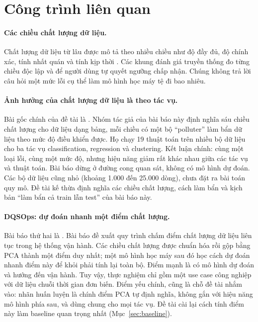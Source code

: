\section{Công trình liên quan}
\label{sec:lien-quan}

\paragraph{Các chiều chất lượng dữ liệu.} Chất lượng dữ liệu từ lâu được mô tả theo nhiều chiều như độ đầy đủ, độ chính xác, tính nhất quán và tính kịp thời \citep{wang1996beyond,batini2009methodologies}. Các khung đánh giá truyền thống đo từng chiều độc lập và để người dùng tự quyết ngưỡng chấp nhận. Chúng không trả lời câu hỏi một mức lỗi cụ thể làm mô hình học máy tệ đi bao nhiêu.

\paragraph{Ảnh hưởng của chất lượng dữ liệu là theo tác vụ.} Bài gốc chính của đề tài là \bbMoh{}. Nhóm tác giả của bài báo này định nghĩa sáu chiều chất lượng cho dữ liệu dạng bảng, mỗi chiều có một bộ ``polluter'' làm bẩn dữ liệu theo mức độ điều khiển được. Họ chạy 19 thuật toán trên nhiều bộ dữ liệu cho ba tác vụ classification, regression và clustering. Kết luận chính: cùng một loại lỗi, cùng một mức độ, nhưng hiệu năng giảm rất khác nhau giữa các tác vụ và thuật toán. Bài báo dừng ở đường cong quan sát, không có mô hình dự đoán. Các bộ dữ liệu cũng nhỏ (khoảng 1.000 đến 25.000 dòng), chưa đặt ra bài toán quy mô. Đề tài kế thừa định nghĩa các chiều chất lượng, cách làm bẩn và kịch bản ``làm bẩn cả train lẫn test'' của bài báo này.

\paragraph{DQSOps: dự đoán nhanh một điểm chất lượng.} Bài báo thứ hai là \bbDQS{}. Bài báo đề xuất quy trình chấm điểm chất lượng dữ liệu liên tục trong hệ thống vận hành. Các chiều chất lượng được chuẩn hóa rồi gộp bằng PCA thành một điểm duy nhất; một mô hình học máy sau đó học cách dự đoán nhanh điểm này để khỏi phải tính lại toàn bộ. Điểm mạnh là có mô hình dự đoán và hướng đến vận hành. Tuy vậy, thực nghiệm chỉ gồm một use case công nghiệp với dữ liệu chuỗi thời gian đơn biến. Điểm yếu chính, cũng là chỗ đề tài nhắm vào: nhãn huấn luyện là chính điểm PCA tự định nghĩa, không gắn với hiệu năng mô hình phía sau, và dùng chung cho mọi tác vụ. Đề tài cài lại cách tính điểm này làm baseline quan trọng nhất (Mục~\ref{sec:baseline}).

